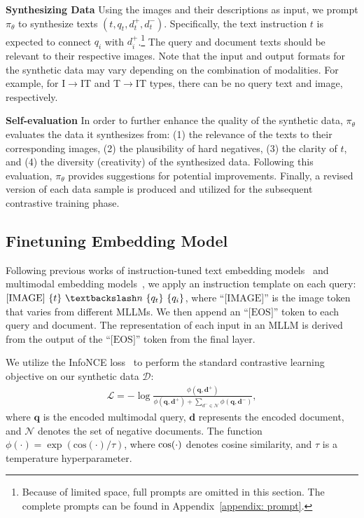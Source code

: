 \noindent \textbf{Synthesizing Data}
Using the images and their descriptions as input, we prompt $\pi_{\theta}$ to synthesize texts $(t, q_t, d^+_t, d^-_t)$.
Specifically, the text instruction $t$ is expected to connect $q_i$ with $d^+_i$.\footnote{Because of limited space, full prompts are omitted in this section. The complete prompts can be found in Appendix~\ref{appendix: prompt}.}
The query and document texts should be relevant to their respective images.
Note that the input and output formats for the synthetic data may vary depending on the combination of modalities.
For example, for I$\rightarrow$IT and T$\rightarrow$IT types, there can be no query text and image, respectively.


\noindent \textbf{Self-evaluation}
In order to further enhance the quality of the synthetic data, $\pi_{\theta}$ evaluates the data it synthesizes from:
(1) the relevance of the texts to their corresponding images,
(2) the plausibility of hard negatives,
(3) the clarity of $t$, and
(4) the diversity (creativity) of the synthesized data.
Following this evaluation, $\pi_{\theta}$ provides suggestions for potential improvements.
Finally, a revised version of each data sample is produced and utilized for the subsequent contrastive training phase.


\subsection{Finetuning Embedding Model \ours{}}

Following previous works of instruction-tuned text embedding models~\cite{bge, Llama2Vec} and multimodal embedding models~\cite{MMEB}, we apply an instruction template on each query: $ \text{[IMAGE]}~\{t\}~\textbackslash n~\{q_t\}~\{q_i\}$, where ``$\text{[IMAGE]}$'' is the image token that varies from different MLLMs.
We then append an ``$\text{[EOS]}$'' token to each query and document.
The representation of each input in an MLLM is derived from the output of the ``$\text{[EOS]}$'' token from the final layer.

We utilize the InfoNCE loss~\cite{infonce} to perform the standard contrastive learning objective on our synthetic data $\mathcal{D}$:
\begin{eqnarray}
\mathcal{L} = -\log\frac{\phi(\mathbf{q},\mathbf{d}^+)}{\phi(\mathbf{q},\mathbf{d}^+) + \sum_{{d}^-\in\mathcal{N}}{\phi(\mathbf{q},\mathbf{d}^-)}}, 
\label{equation:cl}
\end{eqnarray}
where $\mathbf{q}$ is the encoded multimodal query, $\mathbf{d}$ represents the encoded document, and $\mathcal{N}$ denotes the set of negative documents.
The function $\phi(\cdot) = \exp(\text{cos}(\cdot) / \tau)$, where ${\rm cos}(\cdot)$ denotes cosine similarity, and $\tau$ is a temperature hyperparameter.





